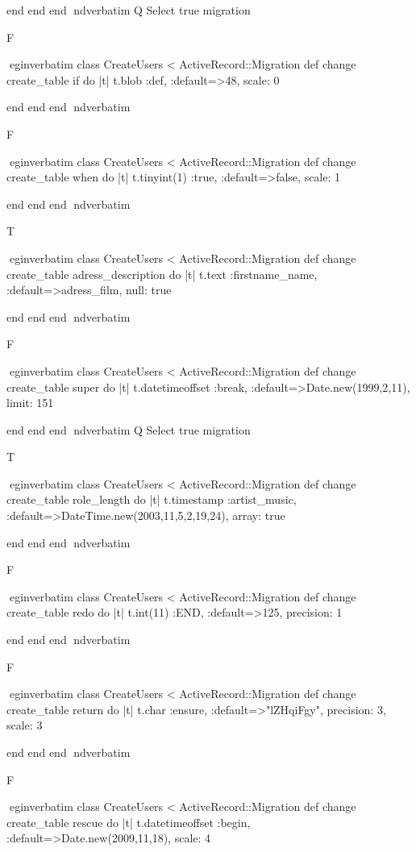     end 
  end 
end
nd{verbatim}
Q
 Select true migration

F

egin{verbatim}
 class CreateUsers < ActiveRecord::Migration 
  def change 
    create_table if do |t| 
      t.blob :def, :default=>48, scale: 0
    
    end 
  end 
end
nd{verbatim}

F

egin{verbatim}
 class CreateUsers < ActiveRecord::Migration 
  def change 
    create_table when do |t| 
      t.tinyint(1) :true, :default=>false, scale: 1
    
    end 
  end 
end
nd{verbatim}

T

egin{verbatim}
 class CreateUsers < ActiveRecord::Migration 
  def change 
    create_table adress_description do |t| 
      t.text :firstname_name, :default=>adress_film, null: true
    
    end 
  end 
end
nd{verbatim}

F

egin{verbatim}
 class CreateUsers < ActiveRecord::Migration 
  def change 
    create_table super do |t| 
      t.datetimeoffset :break, :default=>Date.new(1999,2,11), limit: 151
    
    end 
  end 
end
nd{verbatim}
Q
 Select true migration

T

egin{verbatim}
 class CreateUsers < ActiveRecord::Migration 
  def change 
    create_table role_length do |t| 
      t.timestamp :artist_music, :default=>DateTime.new(2003,11,5,2,19,24), array: true
    
    end 
  end 
end
nd{verbatim}

F

egin{verbatim}
 class CreateUsers < ActiveRecord::Migration 
  def change 
    create_table redo do |t| 
      t.int(11) :END, :default=>125, precision: 1
    
    end 
  end 
end
nd{verbatim}

F

egin{verbatim}
 class CreateUsers < ActiveRecord::Migration 
  def change 
    create_table return do |t| 
      t.char :ensure, :default=>"lZHqiFgy", precision: 3, scale: 3
    
    end 
  end 
end
nd{verbatim}

F

egin{verbatim}
 class CreateUsers < ActiveRecord::Migration 
  def change 
    create_table rescue do |t| 
      t.datetimeoffset :begin, :default=>Date.new(2009,11,18), scale: 4
    
